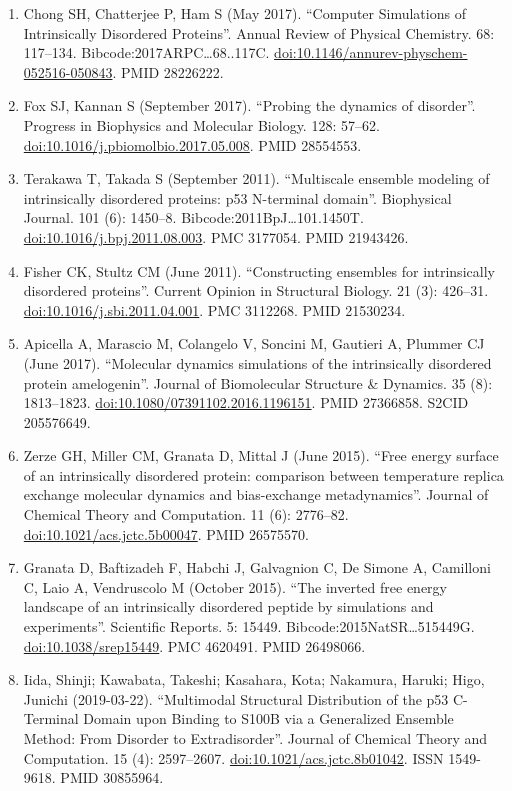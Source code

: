 \documentclass[
]{book}
\begin{document}
\begin{enumerate}
\item
  Chong SH, Chatterjee P, Ham S (May 2017). ``Computer Simulations of Intrinsically Disordered Proteins''. Annual Review of Physical Chemistry. 68: 117--134. Bibcode:2017ARPC\ldots68..117C. \url{doi:10.1146/annurev-physchem-052516-050843}. PMID 28226222.
\item
  Fox SJ, Kannan S (September 2017). ``Probing the dynamics of disorder''. Progress in Biophysics and Molecular Biology. 128: 57--62. \url{doi:10.1016/j.pbiomolbio.2017.05.008}. PMID 28554553.
\item
  Terakawa T, Takada S (September 2011). ``Multiscale ensemble modeling of intrinsically disordered proteins: p53 N-terminal domain''. Biophysical Journal. 101 (6): 1450--8. Bibcode:2011BpJ\ldots101.1450T. \url{doi:10.1016/j.bpj.2011.08.003}. PMC 3177054. PMID 21943426.
\item
  Fisher CK, Stultz CM (June 2011). ``Constructing ensembles for intrinsically disordered proteins''. Current Opinion in Structural Biology. 21 (3): 426--31. \url{doi:10.1016/j.sbi.2011.04.001}. PMC 3112268. PMID 21530234.
\item
  Apicella A, Marascio M, Colangelo V, Soncini M, Gautieri A, Plummer CJ (June 2017). ``Molecular dynamics simulations of the intrinsically disordered protein amelogenin''. Journal of Biomolecular Structure \& Dynamics. 35 (8): 1813--1823. \url{doi:10.1080/07391102.2016.1196151}. PMID 27366858. S2CID 205576649.
\item
  Zerze GH, Miller CM, Granata D, Mittal J (June 2015). ``Free energy surface of an intrinsically disordered protein: comparison between temperature replica exchange molecular dynamics and bias-exchange metadynamics''. Journal of Chemical Theory and Computation. 11 (6): 2776--82. \url{doi:10.1021/acs.jctc.5b00047}. PMID 26575570.
\item
  Granata D, Baftizadeh F, Habchi J, Galvagnion C, De Simone A, Camilloni C, Laio A, Vendruscolo M (October 2015). ``The inverted free energy landscape of an intrinsically disordered peptide by simulations and experiments''. Scientific Reports. 5: 15449. Bibcode:2015NatSR\ldots515449G. \url{doi:10.1038/srep15449}. PMC 4620491. PMID 26498066.
\item
  Iida, Shinji; Kawabata, Takeshi; Kasahara, Kota; Nakamura, Haruki; Higo, Junichi (2019-03-22). ``Multimodal Structural Distribution of the p53 C-Terminal Domain upon Binding to S100B via a Generalized Ensemble Method: From Disorder to Extradisorder''. Journal of Chemical Theory and Computation. 15 (4): 2597--2607. \url{doi:10.1021/acs.jctc.8b01042}. ISSN 1549-9618. PMID 30855964.

\end{enumerate}
\end{document}
